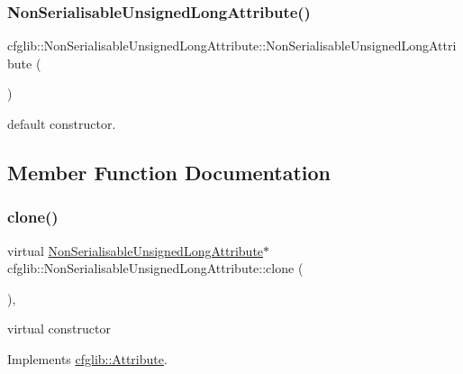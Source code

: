 \subsubsection{\texorpdfstring{Non\+Serialisable\+Unsigned\+Long\+Attribute()}{NonSerialisableUnsignedLongAttribute()}\hspace{0.1cm}{\footnotesize\ttfamily [2/2]}}
{\footnotesize\ttfamily cfglib\+::\+Non\+Serialisable\+Unsigned\+Long\+Attribute\+::\+Non\+Serialisable\+Unsigned\+Long\+Attribute (\begin{DoxyParamCaption}{ }\end{DoxyParamCaption})\hspace{0.3cm}{\ttfamily [inline]}}

default constructor. 

\subsection{Member Function Documentation}
\mbox{\label{classcfglib_1_1NonSerialisableUnsignedLongAttribute_a3c01da3fbc7e617c7a919716a1142f57}} 
\subsubsection{\texorpdfstring{clone()}{clone()}}
{\footnotesize\ttfamily virtual \hyperlink{classcfglib_1_1NonSerialisableUnsignedLongAttribute}{Non\+Serialisable\+Unsigned\+Long\+Attribute}$\ast$ cfglib\+::\+Non\+Serialisable\+Unsigned\+Long\+Attribute\+::clone (\begin{DoxyParamCaption}{ }\end{DoxyParamCaption})\hspace{0.3cm}{\ttfamily [inline]}, {\ttfamily [virtual]}}

virtual constructor 

Implements \hyperlink{classcfglib_1_1Attribute_a107366042fdafe881215426059fec3f8}{cfglib\+::\+Attribute}.

\mbox{\label{classcfglib_1_1NonSerialisableUnsignedLongAttribute_aedeced928ce8d3de8b0a691371b6aded}} 
